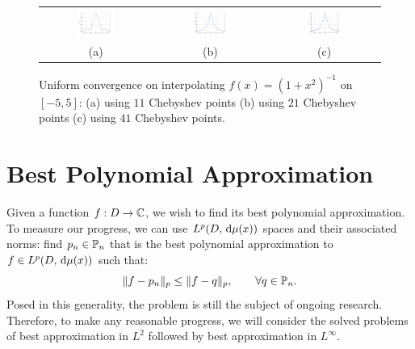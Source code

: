 \begin{figure}[htbp]
\begin{center}
\begin{tabular}{ccc}
\hspace*{-0.5cm}\includegraphics[width=0.35\textwidth]{rungefixed1}&
\hspace*{-0.5cm}\includegraphics[width=0.35\textwidth]{rungefixed2}&
\hspace*{-0.5cm}\includegraphics[width=0.35\textwidth]{rungefixed3}\\
(a) & (b) & (c)\\
\end{tabular}
\caption{Uniform convergence on interpolating $f(x) = (1+x^2)^{-1}$ on $[-5,5]$: (a) using $11$ Chebyshev points (b) using $21$ Chebyshev points (c) using $41$ Chebyshev points.}
\label{figure:RungeFixed}
\end{center}
\end{figure}

\section{Best Polynomial Approximation}

Given a function $f:D\to\C$, we wish to find its best polynomial approximation. To measure our progress, we can use $L^p(D,\ud\mu(x))$ spaces and their associated norms: find $p_n\in\P_n$ that is the best polynomial approximation to $f\in L^p(D,\ud\mu(x))$ such that:
\[
\|f-p_n\|_p \le \|f-q\|_p,\qquad\forall q\in\P_n.
\]
Posed in this generality, the problem is still the subject of ongoing research. Therefore, to make any reasonable progress, we will consider the solved problems of best approximation in $L^2$ followed by best approximation in $L^\infty$.

